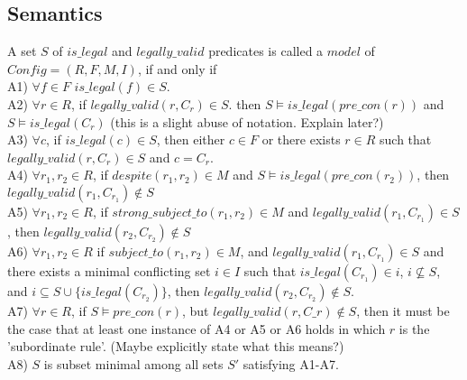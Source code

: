 \subsection{Semantics}
A set $S$ of $is\_legal$ and $legally\_valid$ predicates is called a $model$ of $Config = (R,F,M,I)$, if and only if\\
\newline
A1) $\forall f \in F$ $is\_legal(f) \in S$.\\
\newline
A2) $\forall r \in R$, if $legally\_valid(r,C_{r}) \in S$. then $S\models is\_legal(pre\_con(r))$ and $S\models is\_legal(C_{r})$ (this is a slight abuse of notation. Explain later?) \\
\newline
A3) $\forall c$, if $is\_legal(c) \in S$, then either $c\in F$ or there exists $r \in R$ such that $legally\_valid(r,C_{r}) \in S$ and $c= C_{r}$.\\
\newline
A4) $\forall r_{1}, r_{2} \in R$, if $despite(r_{1}, r_{2}) \in M$ and $S\models is\_legal(pre\_con(r_{2}))$, then $legally\_valid(r_{1},C_{r_{1}}) \notin S$\\
\newline
A5) $\forall r_{1}, r_{2} \in R$, if $strong\_subject\_to(r_{1}, r_{2}) \in M$ and $legally\_valid(r_{1},C_{r_{1}}) \in S$, then $legally\_valid(r_{2},C_{r_{2}}) \notin S$\\
\newline
A6) $\forall r_{1},r_{2} \in R$ if $subject\_to(r_{1},r_{2}) \in M$, and $legally\_valid(r_{1},C_{r_{1}}) \in S$ and there exists a minimal conflicting set $i \in I$ such that $is\_legal(C_{r_{1}}) \in i$, $i\not\subseteq S$, and $i\subseteq S\cup \{is\_legal(C_{r_{2}})\}$, then $legally\_valid(r_{2},C_{r_{2}}) \notin S$.\\
\newline
A7) $\forall r\in R$, if $S\models pre\_con(r)$, but $legally\_valid(r,C\_{r})\notin S$, then it must be the case that at least one instance of A4 or A5 or A6 holds in which $r$ is the 'subordinate rule'. (Maybe explicitly state what this means?)\\
\newline
A8) $S$ is subset minimal among all sets $S'$ satisfying A1-A7.

